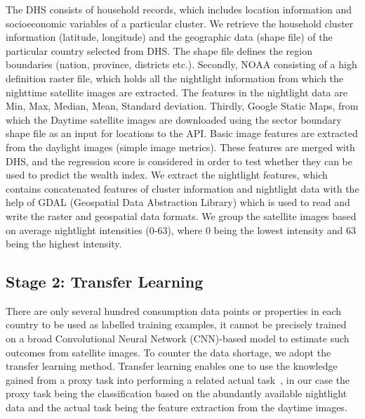 The DHS consists of household records, which includes location information and socioeconomic variables of a particular cluster. We retrieve the household cluster information (latitude, longitude) and the geographic data (shape file) of the particular country selected from DHS. The shape file defines the region boundaries (nation, province, districts etc.). Secondly, NOAA consisting of a high definition raster file, which holds all the nightlight information from which the nighttime satellite images are extracted. The features in the nightlight data are Min, Max, Median, Mean, Standard deviation. Thirdly, Google Static Maps, from which the Daytime satellite images are downloaded using the sector boundary shape file as an input for locations to the API. Basic image features are extracted from the daylight images (simple image metrics). These features are merged with \ac{DHS}, and the regression score is considered in order to test whether they can be used to predict the wealth index. We extract the nightlight features, which contains concatenated features of cluster information and nightlight data with the help of \ac{GDAL} (Geospatial Data Abstraction Library) which is used to read and write the raster and geospatial data formats. We group the satellite images based on average nightlight intensities ($0$-$63$), where $0$ being the lowest intensity and $63$ being the highest intensity.


\subsection{Stage 2: Transfer Learning}

There are only several hundred consumption data points or properties in each country to be used as labelled training examples, it cannot be precisely trained on a broad Convolutional Neural Network (CNN)-based model to estimate such outcomes from satellite images. 
To counter the data shortage, we adopt the transfer learning method. Transfer learning enables one to use the knowledge gained from a proxy task into performing a related actual task~\cite{8122666}, in our case the proxy task being the classification based on the abundantly available nightlight data and the actual task being the feature extraction from the daytime images.


